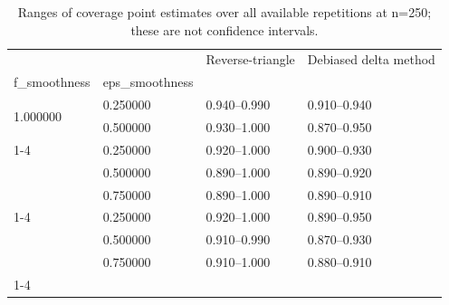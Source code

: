 \begin{table}
\caption{Ranges of coverage point estimates over all available repetitions at n=250; these are not confidence intervals.}
\label{tab:experiment_details_additional_coverage_summary_N250}
\begin{tabular}{llll}
\toprule
 &  & Reverse-triangle & Debiased delta method \\
f_smoothness & eps_smoothness &  &  \\
\midrule
\multirow[t]{2}{*}{1.000000} & 0.250000 & 0.940--0.990 & 0.910--0.940 \\
 & 0.500000 & 0.930--1.000 & 0.870--0.950 \\
\cline{1-4}
\multirow[t]{3}{*}{1.500000} & 0.250000 & 0.920--1.000 & 0.900--0.930 \\
 & 0.500000 & 0.890--1.000 & 0.890--0.920 \\
 & 0.750000 & 0.890--1.000 & 0.890--0.910 \\
\cline{1-4}
\multirow[t]{3}{*}{2.000000} & 0.250000 & 0.920--1.000 & 0.890--0.950 \\
 & 0.500000 & 0.910--0.990 & 0.870--0.930 \\
 & 0.750000 & 0.910--1.000 & 0.880--0.910 \\
\cline{1-4}
\bottomrule
\end{tabular}
\end{table}
